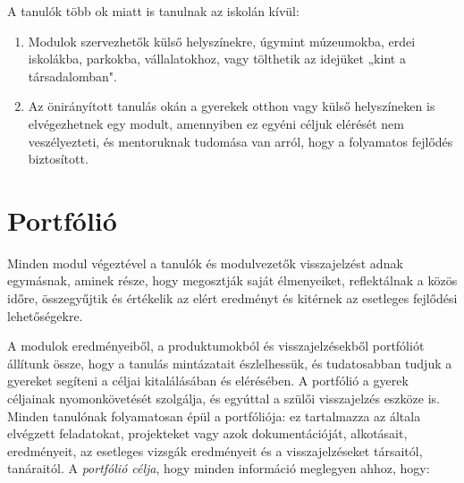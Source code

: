 A tanulók több ok miatt is tanulnak az iskolán kívül:
\begin{enumerate}
\item Modulok szervezhetők külső helyszínekre, úgymint múzeumokba, erdei iskolákba, parkokba, vállalatokhoz, vagy tölthetik az idejüket „kint a társadalomban".

\item Az önirányított tanulás okán a gyerekek otthon vagy külső helyszíneken is elvégezhetnek egy modult, amennyiben ez egyéni céljuk elérését nem veszélyezteti, és mentoruknak tudomása van arról, hogy a folyamatos fejlődés biztosított.
\end{enumerate}




\section{Portfólió}
Minden modul végeztével a tanulók és modulvezetők visszajelzést adnak egymásnak, aminek része, hogy megosztják saját élmenyeiket, reflektálnak a közös időre, összegyűjtik és értékelik az elért eredményt és kitérnek az esetleges fejlődési lehetőségekre. 

A modulok eredményeiből, a produktumokból és visszajelzésekből portfóliót állítunk össze, hogy a tanulás mintázatait észlelhessük, és tudatosabban tudjuk a gyereket segíteni a céljai kitalálásában és elérésében. A portfólió a gyerek céljainak nyomonkövetését szolgálja, és egyúttal a szülői visszajelzés eszköze is. Minden tanulónak folyamatosan épül a portfóliója: ez tartalmazza az általa elvégzett feladatokat, projekteket vagy azok dokumentációját, alkotásait, eredményeit, az esetleges vizsgák eredményeit és a visszajelzéseket társaitól, tanáraitól. A \emph{portfólió célja}, hogy minden információ meglegyen ahhoz, hogy:

